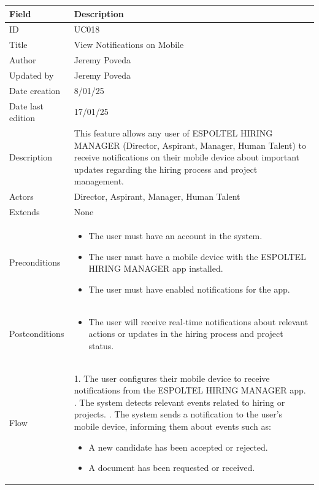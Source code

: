 \documentclass{scrreprt}
\begin{document}
\begin{table}[H]
	\centering
	\begin{tabular}{|p{3cm}|p{10cm}|}
		\hline
		\textbf{Field} & \textbf{Description} \\ \hline
		ID & UC018 \\ \hline
		Title & View Notifications on Mobile \\ \hline
		Author & Jeremy Poveda \\ \hline
		Updated by & Jeremy Poveda \\ \hline
		Date creation & 8/01/25 \\ \hline
		Date last edition & 17/01/25 \\ \hline
		Description & 
		This feature allows any user of ESPOLTEL HIRING MANAGER (Director, Aspirant, Manager, Human Talent) to receive notifications on their mobile device about important updates regarding the hiring process and project management. \\ \hline
		Actors & Director, Aspirant, Manager, Human Talent \\ \hline
		Extends & None \\ \hline
		Preconditions & 
		\begin{itemize}
			\item The user must have an account in the system.
			\item The user must have a mobile device with the ESPOLTEL HIRING MANAGER app installed.
			\item The user must have enabled notifications for the app.
		\end{itemize} \\ \hline
		Postconditions & 
		\begin{itemize}
			\item The user will receive real-time notifications about relevant actions or updates in the hiring process and project status.
		\end{itemize} \\ \hline
		Flow & 
		1. The user configures their mobile device to receive notifications from the ESPOLTEL HIRING MANAGER app. \newline
		2. The system detects relevant events related to hiring or projects. \newline
		3. The system sends a notification to the user's mobile device, informing them about events such as:
		\begin{itemize}
			\item A new candidate has been accepted or rejected.
			\item A document has been requested or received.

\end{itemize}
\end{tabular}
\end{table}
\end{document}
